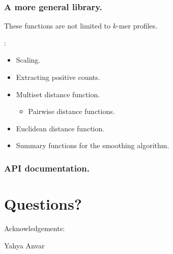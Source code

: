 \documentclass[slidestop]{beamer}
\begin{document}
\begin{frame}
  \frametitle{A more general library.}

  These functions are not limited to $k$-mer profiles.
  \bigskip

  :
  \begin{itemize}
    \item Scaling.
    \item Extracting positive counts.
    \item Multiset distance function.
    \begin{itemize}
      \item Pairwise distance functions.
    \end{itemize}
    \item Euclidean distance function.
    \item Summary functions for the smoothing algorithm.
  \end{itemize}
\end{frame}

\begin{frame}
  \frametitle{API documentation.}
\end{frame}

\section{Questions?}
\lastpagetemplate
\begin{fframe}
  \begin{center}
    Acknowledgements:
    \bigskip
    \bigskip

    Yahya Anvar

  \end{center}

  \vfill
\end{fframe}
\end{document}
